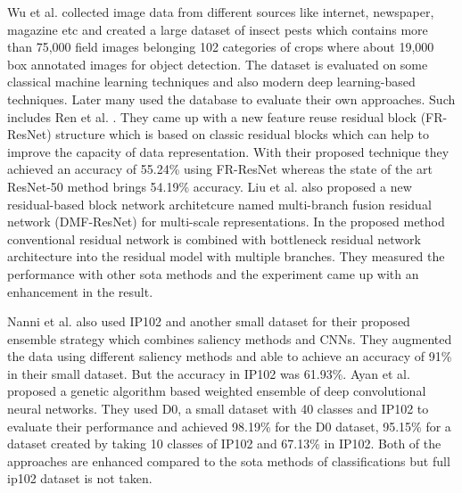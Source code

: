 Wu et al. \cite{wu2019ip102} collected image data from different sources like internet, newspaper, magazine etc and created a large dataset of insect pests which contains more than 75,000 field images belonging 102 categories of crops where about 19,000 box annotated images for object detection. The dataset is evaluated on some classical machine learning techniques and also modern deep learning-based techniques. Later many used the database to evaluate their own approaches. Such includes Ren et al. \cite{ren2019feature}. They came up with a new feature reuse residual block (FR-ResNet) structure which is based on classic residual blocks which can help to improve the capacity of data representation. With their proposed technique they achieved an accuracy of 55.24\% using FR-ResNet whereas the state of the art ResNet-50 method brings 54.19\% accuracy. Liu et al. \cite{liu2016localization} also proposed a new residual-based block network architetcure named multi-branch fusion residual network (DMF-ResNet) for multi-scale representations. In the proposed method conventional residual network is combined with bottleneck residual network architecture into the residual model with multiple branches. They measured the performance with other sota methods and the experiment came up with an enhancement in the result.

Nanni et al. \cite{nanni2020insect} also used IP102 and another small dataset for their proposed ensemble strategy which combines saliency methods and CNNs. They augmented the data using different saliency methods and able to achieve an accuracy of 91\% in their small dataset. But the accuracy in IP102 was 61.93\%. Ayan et al. \cite{ayan2020crop} proposed a genetic algorithm based weighted ensemble of deep convolutional neural networks. They used D0, a small dataset with 40 classes and IP102 to evaluate their performance and achieved 98.19\% for the D0 dataset, 95.15\% for a dataset created by taking 10 classes of IP102 and 67.13\% in IP102. Both of the approaches are enhanced compared to the sota methods of classifications but full ip102 dataset is not taken.